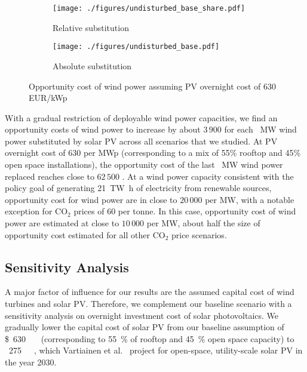 \documentclass[review, 3p, times]{elsarticle} %
\newcommand{\COO}{\ensuremath{\mathrm{CO_2}} }
\begin{document}
    \begin{figure*}[h!t]
        \centering
        \begin{subfigure}[b]{0.475\textwidth}
            \centering
            \texttt{[image: ./figures/undisturbed\_base\_share.pdf]}
            \caption{Relative substitution}
            \label{fig:rel_substitution}
        \end{subfigure}
        \hfill
        \begin{subfigure}[b]{0.475\textwidth}
            \centering
            \texttt{[image: ./figures/undisturbed\_base.pdf]}
            \caption{Absolute substitution}
            \label{fig::abs_substitution}
        \end{subfigure}
        \caption{Opportunity cost of wind power assuming PV overnight cost of 630 EUR/kWp}
        \label{figure:opportunity-cost-base}
    \end{figure*}

    With a gradual restriction of deployable wind power capacities, we find an opportunity costs of wind power
    to increase by about $3\,900$ \EUR for each \SI{}{\mega\watt} wind power substituted by solar PV across all scenarios
    that we studied.
    At PV overnight cost of $630$ \EUR per MWp (corresponding to a mix of 55\% rooftop and 45\% open space
    installations), the opportunity cost of the last \SI{}{\mega\watt} wind power replaced reaches close to $62\,500$ \EUR.
    At a wind power capacity consistent with the policy goal of generating \SI{21}{\tera\watt\hour} of electricity
    from renewable sources, opportunity cost for wind power are in close to $20\,000$ \EUR per MW, with a notable
    exception for \COO prices of $60$ \EUR per tonne.
    In this case, opportunity cost of wind power are estimated at close to $10\,000$ \EUR per MW, about half the size of
    opportunity cost estimated for all other \COO price scenarios.

    \subsection{Sensitivity Analysis} \label{subsec:sensitivity}
    A major factor of influence for our results are the assumed capital cost of wind turbines and solar PV\@.
    Therefore, we complement our baseline scenario with a sensitivity analysis on overnight investment cost of solar
    photovoltaics.
    We gradually lower the capital cost of solar PV from our baseline assumption of \SI{630}[\$]{\per\kilo\wattpeak}
    (corresponding to \SI{55}{\percent} of rooftop and \SI{45}{\percent} open space capacity) to
    \EUR~\SI{275}{\per\kilo\wattpeak}, which Vartiainen et al.~\cite{Vartiainen2019} project for open-space,
    utility-scale solar PV in the year 2030.
\end{document}
